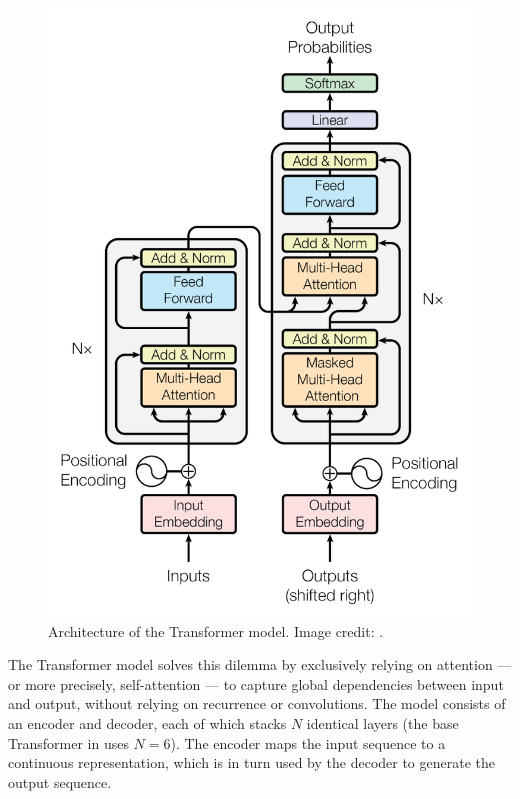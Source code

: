 \documentclass[10pt,a4paper]{article}
\begin{document}
\begin{figure}[ht]
    \centering
    \includegraphics[scale=0.45]{images/Transformer.PNG}
    \caption{Architecture of the Transformer model. Image credit: \cite{transformer}.}
    \label{fig:transformer}
\end{figure}

The Transformer model solves this dilemma by exclusively relying on attention --- or more precisely, self-attention --- to capture global dependencies between input and output, without relying on recurrence or convolutions.
The model consists of an encoder and decoder, each of which stacks $N$ identical layers  (the base Transformer in \citet{transformer} uses $N=6$). The encoder maps the input sequence to a continuous representation, which is in turn used by the decoder to generate the output sequence.
\end{document}
